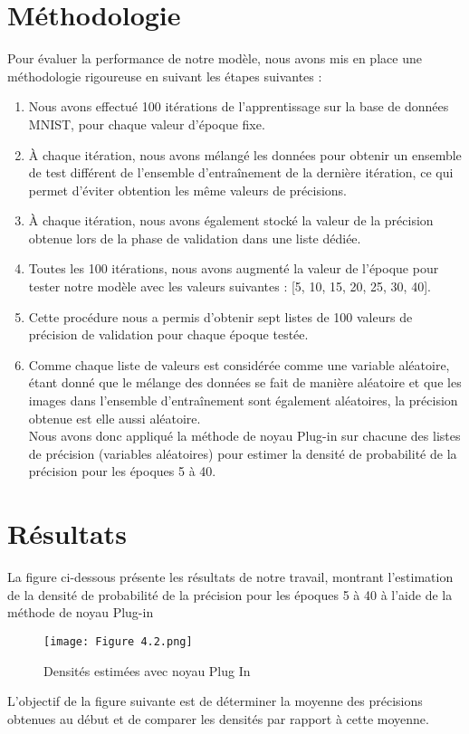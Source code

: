 \section{Méthodologie}
Pour évaluer la performance de notre modèle, nous avons mis en place une méthodologie rigoureuse en suivant les étapes suivantes :
\begin{enumerate}
    \item Nous avons effectué 100 itérations de l'apprentissage sur la base de données MNIST, pour chaque valeur d'époque fixe.
    \item À chaque itération, nous avons mélangé les données pour obtenir un ensemble de test différent de l'ensemble d'entraînement de la dernière itération, ce qui permet d'éviter obtention les même valeurs de précisions.
    \item À chaque itération, nous avons également stocké la valeur de la précision obtenue lors de la phase de validation dans une liste dédiée.
    \item Toutes les 100 itérations, nous avons augmenté la valeur de l'époque pour tester notre modèle avec les valeurs suivantes : [5, 10, 15, 20, 25, 30, 40].
    \item Cette procédure nous a permis d'obtenir sept listes de 100 valeurs de précision de validation pour chaque époque testée.
    \item Comme chaque liste de valeurs est considérée comme une variable aléatoire, étant donné que le mélange des données se fait de manière aléatoire et que les images dans l'ensemble d'entraînement sont également aléatoires, la précision obtenue est elle aussi aléatoire.\\ Nous avons donc appliqué la méthode de noyau Plug-in sur chacune des listes de précision (variables aléatoires) pour estimer la densité de probabilité de la précision pour les époques 5 à 40.
    \\
\end{enumerate}
\section{Résultats}
La figure ci-dessous présente les résultats de notre travail, montrant l'estimation de la densité de probabilité de la précision pour les époques 5 à 40 à l'aide de la méthode de noyau Plug-in
\clearpage
\begin{figure}[!h]
  \centering
  \texttt{[image: Figure 4.2.png]}
  \caption{Densités estimées avec noyau Plug In}
  \label{fig:Densités estimées avec noyau Plug In}
\end{figure}
\clearpage
L'objectif de la figure suivante est de déterminer la moyenne des précisions obtenues au début et de comparer les densités par rapport à cette moyenne.

